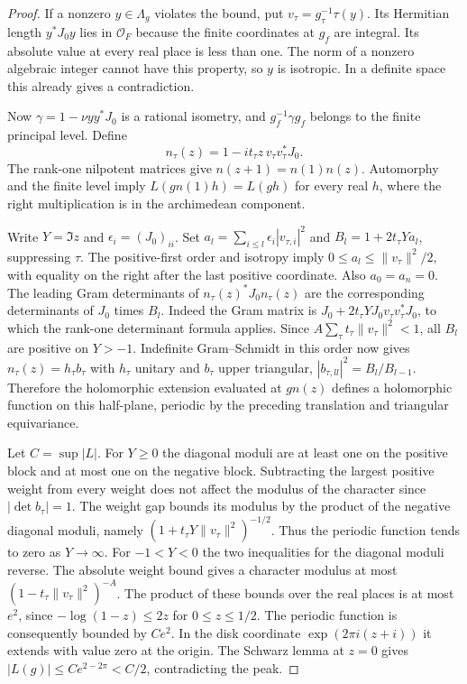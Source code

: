 \documentclass[a4paper,11pt]{article}
\theoremstyle{definition}
\theoremstyle{remark}
\numberwithin{equation}{section}
\begin{document}
\begin{proof}
If a nonzero \(y\in\Lambda_g\) violates the bound, put
\(v_\tau=g_\tau^{-1}\tau(y)\). Its Hermitian length
\(y^*J_0y\) lies in \(\mathcal O_F\) because the finite
coordinates at \(g_f\) are integral. Its absolute value
at every real place is less than one. The norm of a
nonzero algebraic integer cannot have this property,
so \(y\) is isotropic. In a definite space this already
gives a contradiction.

Now \(\gamma=1-\nu yy^*J_0\) is a rational isometry,
and \(g_f^{-1}\gamma g_f\) belongs to the finite principal
level. Define
\[
       n_\tau(z)=1-i t_\tau z\,v_\tau v_\tau^*J_0.
\]
The rank-one nilpotent matrices give \(n(z+1)=n(1)n(z)\).
Automorphy and the finite level imply
\(L(g n(1)h)=L(gh)\) for every real \(h\), where the
right multiplication is in the archimedean component.

Write \(Y=\Im z\) and \(\epsilon_i=(J_0)_{ii}\). Set
\(a_l=\sum_{i\le l}\epsilon_i |v_{\tau,i}|^2\) and
\(B_l=1+2t_\tau Y a_l\), suppressing \(\tau\). The
positive-first order and isotropy imply
\(0\le a_l\le\|v_\tau\|^2/2\), with equality on the right
after the last positive coordinate. Also \(a_0=a_n=0\).
The leading Gram determinants of \(n_\tau(z)^*J_0 n_\tau(z)\)
are the corresponding determinants of \(J_0\) times \(B_l\).
Indeed the Gram matrix is \(J_0+2t_\tau Y
J_0v_\tau v_\tau^*J_0\), to which the rank-one determinant
formula applies. Since \(A\sum_\tau t_\tau\|v_\tau\|^2<1\),
all \(B_l\) are positive on \(Y>-1\). Indefinite
Gram--Schmidt in this order now gives \(n_\tau(z)=h_\tau b_\tau\)
with \(h_\tau\) unitary and \(b_\tau\) upper triangular,
\(|b_{\tau,ll}|^2=B_l/B_{l-1}\). Therefore the holomorphic
extension evaluated at \(g n(z)\) defines a holomorphic
function on this half-plane, periodic by the preceding
translation and triangular equivariance.

Let \(C=\sup|L|\). For \(Y\ge0\) the diagonal moduli are
at least one on the positive block and at most one on the
negative block. Subtracting the largest positive weight
from every weight does not affect the modulus of the
character since \(|\det b_\tau|=1\). The weight gap bounds
its modulus by the product of the negative diagonal moduli,
namely \((1+t_\tau Y\|v_\tau\|^2)^{-1/2}\).
Thus the periodic function tends to zero as \(Y\to\infty\).
For \(-1<Y<0\) the two inequalities for the diagonal
moduli reverse. The absolute weight bound gives a character
modulus at most \((1-t_\tau\|v_\tau\|^2)^{-A}\).
The product of these bounds over the real places is at
most \(e^2\), since \(-\log(1-z)\le2z\) for
\(0\le z\le1/2\). The periodic function is consequently
bounded by \(Ce^2\). In the disk coordinate
\(\exp(2\pi i(z+i))\) it extends with value zero at the
origin. The Schwarz lemma at \(z=0\) gives
\(|L(g)|\le C e^{2-2\pi}<C/2\), contradicting the peak.
\end{proof}
\end{document}
